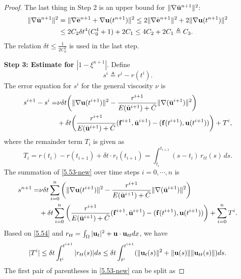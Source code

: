 \documentclass{article}
\theoremstyle{definition}                   %
\begin{document}
\begin{proof}
%
The last thing in Step 2 is an upper bound for $\|\nabla \bar{\bf u}^{n+1} \|^2$:
\begin{align}
\|\nabla \bar{\bf u}^{n+1} \|^2
&=\|\nabla \bar{\bf e}^{n+1} + \nabla {\bf u}(t^{n+1}) \|^2 
\le 2 \|\nabla\bar{\bf e}^{n+1} \|^2 
+ 2 \| \nabla {\bf u}(t^{n+1}) \|^2 
\notag\\
&\le 2C_2 \delta t^4 (C_0^4+1) + 2 C_1
\le 4C_2 + 2 C_1 \triangleq C_3.
\label{5.52-new}
\end{align}
The relation $\delta t\le \frac{1}{2C_0^2}$ is used in the last step.

{\bf Step 3: Estimate for $|1-\xi^{n+1}|$}.
Define
\begin{equation}
s^i \triangleq r^i - r(t^i).
\end{equation}
The error equation for $s^i$ for the general viscosity $\nu$ is 
\begin{align}
s^{i+1} - s^i 
=& \nu \delta t
\bigg( \|\nabla{\bf u}(t^{i+1})\|^2
- \frac{r^{i+1}}{E(\bar{\bf u}^{i+1}) + \bar{C}}
\|\nabla(\bar{\bf u}^{i+1})\|^2 
\bigg) \notag \\ 
&+ 
\delta t \bigg( 
\frac{r^{i+1}}{E(\bar{\bf u}^{i+1}) + \bar{C}}
({\bf f}^{i+1}, \bar{\bf u}^{i+1})
- ({\bf f}(t^{i+1}), {\bf u}(t^{i+1}))
\bigg)
+ T^i,
\label{5.53-new}
\end{align}
where the remainder term $T_i$ is given as 
\begin{equation}
\label{5.54}
T_i = r(t_i) - r(t_{i+1}) + \delta t\cdot r_t(t_{i+1})
= \int_{t_i}^{t_{i+1}} (s - t_i)\, r_{tt}(s)\, ds .
\end{equation}
%
The summation of \eqref{5.53-new} over time steps $i=0, \cdots, n$ is
\begin{align}
s^{n+1} 
=& \nu \delta t
\sum_{i=0}^n \bigg( \|\nabla{\bf u}(t^{i+1})\|^2
- \frac{r^{i+1}}{E(\bar{\bf u}^{i+1}) + \bar{C}}
\|\nabla(\bar{\bf u}^{i+1})\|^2 
\bigg) \notag \\ 
&+ 
\delta t \sum_{i=0}^n \bigg( 
\frac{r^{i+1}}{E(\bar{\bf u}^{i+1}) + \bar{C}}
({\bf f}^{i+1}, \bar{\bf u}^{i+1})
- ({\bf f}(t^{i+1}), {\bf u}(t^{i+1}))
\bigg)
+ \sum_{i=0}^n T^i.
\label{5.55-new}
\end{align}
%
Based on \eqref{5.54} and $r_{tt}=\int_{\Omega} |{\bf u}_t|^2 + {\bf u}\cdot{\bf u}_{tt} dx$, we have 
\begin{align}
|T^i|\le \delta t \int_{t^i}^{t^{i+1}} |r_{tt}(s)| ds
\le\delta t \int_{t^i}^{t^{i+1}} 
( \|{\bf u}_t(s)\|^2 + \|{\bf u}(s)\| \|{\bf u}_{tt}(s)\| )ds.
\label{5.57-new}
\end{align}
The first pair of parentheses in \eqref{5.53-new} can be split as

\end{proof}
\end{document}
